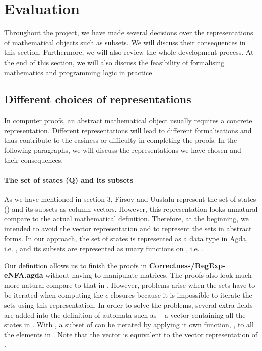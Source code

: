 \section{Evaluation}
\par Throughout the project, we have made several
decisions over the representations of mathematical objects such as
subsets. We will discuss their consequences in this
section. Furthermore, we will also review the whole development process. At the end of this section, we
will also discuss the feasibility of formalising mathematics and
programming logic in practice. 


\subsection{Different choices of representations}
\par In computer proofs, an abstract mathematical
object usually requires a concrete representation. Different representations will lead to different
formalisations and thus contribute to the
easiness or difficulty in completing the proofs. In the
following paragraphs, we will discuss the representations we have
chosen and their consequences. 

\paragraph{The set of states (Q) and its subsets} As we have mentioned
in section 3, Firsov and Uustalu \cite{firsov2013} represent the set of states () and its subsets
as column vectors. However, this representation looks unnatural compare
to the actual mathematical definition. Therefore, at the beginning, we intended to avoid the vector representation and to
represent the sets in abstract forms. In our approach, the set of states is represented as a data type in Agda, i.e. , and its
subsets are represented as unary functions on , i.e. . 

\par Our definition allows us to finish the proofs in
\textbf{Correctness/RegExp-eNFA.agda} without having to
manipulate matrices. The proofs also look much more natural compare to that in
\cite{firsov2013}. However, problems arise when the sets have to be iterated when computing the 
\(\epsilon\)-closures because it is impossible to iterate the sets
using this representation. In order to solve the problems, several
extra fields are added into the definition of automata such as 
-- a vector containing all the states in . With , a subset
of  can be iterated by applying it own function, , to all the elements in . Note that the vector 
is equivalent to the vector representation of . 

